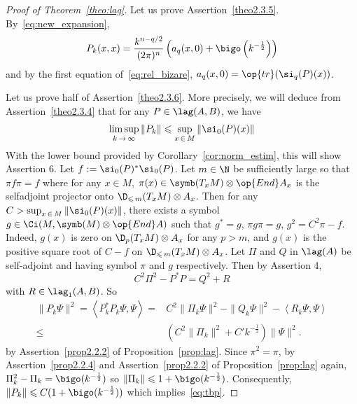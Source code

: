 \begin{proof}[Proof of Theorem~\ref{theo:lag}]
Let us prove Assertion~\eqref{theo2.3.5}. By~\eqref{eq:new_expansion},
\[
P_k(x,x) = \frac{k^{n-q/2}}{ (2\pi)^n} \left(a_q(x,0) + \bigo \left(
k^{-\frac{1}{2}}\right) \right)
\]
and by the first equation of~\eqref{eq:rel_bizare}, $a_q(x,0) = \op{tr} (\si_q(P) (x))$.

 Let us prove half of Assertion~\eqref{theo2.3.6}. More precisely, we will deduce from Assertion~\eqref{theo2.3.4} that for any $P \in \lag (A,B)$, we have
\begin{gather}\label{eq:tbp}
\limsup_{k\,\rightarrow\,\infty} \| P_k \| \leqslant \sup_{x\,\in\,M} \|
\si_0 (P)(x) \|
\end{gather}
With the lower bound provided by Corollary~\ref{cor:norm_estim}, this will show Assertion 6. Let $f := \si_0(P)^* \si_0 (P)$. Let $m \in \N$ be sufficiently large so that $\pi f \pi = f $ where for any $x \in M$, $\pi (x)
\in \symb (T_xM)
\otimes \op{End} A_x $ is the selfadjoint projector onto $\D_{\leqslant\,m } (T_xM) \otimes A_x$. Then for any $C > \sup_{x\,\in\,M} \|
\si_0 (P)(x) \|$, there exists a symbol $g \in \Ci (M, \symb (M) \otimes
\op{End} A)$ such that $g ^* = g$, $\pi g \pi = g $, $g^2 = C^2 \pi - f$. Indeed, $g(x)$ is zero on $\D_p (T_xM) \otimes A_x$ for any $ p > m$, and $g(x) $ is the positive square root of $C - f$ on $\D_{\leqslant\,m} (T_xM) \otimes A_x$. Let $\Pi$ and $Q$ in $\lag (A)$ be self-adjoint and having symbol $\pi$ and $g$ respectively. Then by Assertion 4,
\[
C^2 \Pi^2 - P^* P = Q^2 + R
\]
with $R \in \lag_1 (A,B)$. So
\begin{align*}
\| P_k \Psi \| ^2 = \left\langle P_k^* P_k \Psi, \Psi \right\rangle = & C^2 \| \Pi_k
\Psi \|^2 - \| Q_k \Psi \|^2 - \left\langle R_k \Psi, \Psi \right\rangle \\
\leqslant & \left(C^2 \| \Pi_k \|^2 + C' k^{-\frac{1}{2}}\right) \| \Psi \|^2.
\end{align*}
by Assertion~\eqref{prop2.2.2} of Proposition~\ref{prop:lag}. Since $\pi^2 = \pi$, by Assertion~\eqref{prop2.2.4} and Assertion~\eqref{prop2.2.2} of Proposition~\ref{prop:lag} again, $\Pi_k^2 -
\Pi_k = \bigo (k^{-\frac{1}{2}})$ so $\| \Pi_k \| \leqslant 1 + \bigo (k^{-\frac{1}{2}})$. Consequently, $\| P_k \| \leqslant C (1 + \bigo (k^{-\frac{1}{2}}))$ which implies~\eqref{eq:tbp}.





\end{proof}
